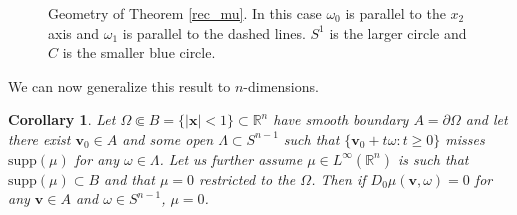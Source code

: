 \documentclass[a4paper,12pt]{amsart}
\numberwithin{equation}{section}
\theoremstyle{plain}
\numberwithin{theorem}{section}
\newtheorem{corollary}[theorem]{Corollary}
\theoremstyle{definition}
\theoremstyle{remark}
\theoremstyle{remark}
\theoremstyle{remark}
\newcommand{\vv}{{\mathbf{v}}}
\newcommand{\vx}{{\mathbf{x}}}
\newcommand{\vy}{{\mathbf{y}}}
\newcommand{\vz}{{\mathbf{z}}}
\begin{document}
{\begin{figure}
\centering
{}
\caption{Geometry of Theorem \ref{rec_mu}. In this case $\omega_0$ is parallel to the $x_2$ axis and $\omega_1$ is parallel to the dashed lines. $S^1$ is the larger circle and $C$ is the smaller blue circle.}
\label{fig_proof}
\end{figure}

We can now generalize this result to $n$-dimensions.

\begin{corollary}\label{corr_det_mu}
Let $\Omega \Subset B = \{|\vx| <1\} \subset \mathbb{R}^n$ have smooth boundary $A = \partial \Omega$ and let there exist $\vv_0 \in A$ and some open $\Lambda \subset S^{n-1}$ such that $\{\vv_0 + t\omega : t\geq 0\}$ misses $\text{supp}(\mu)$ for any $\omega \in \Lambda$. Let us further assume $\mu \in L^\infty(\mathbb{R}^n)$ is such that $\text{supp}(\mu) \subset B$ and that $\mu = 0$ restricted to the $\Omega$. Then if $D_0\mu(\vv,\omega) = 0$ for any $\vv\in A$ and $\omega \in S^{n-1}$, $\mu = 0$.
\end{corollary}

}
\end{document}
